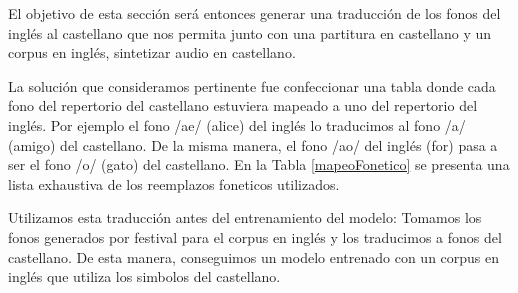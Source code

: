 El objetivo de esta sección será entonces generar una traducción de los fonos del inglés al castellano que nos permita junto con una partitura en castellano y un corpus en inglés, sintetizar audio en castellano.


La solución que consideramos pertinente fue confeccionar una tabla donde cada fono del repertorio del castellano estuviera mapeado a uno del repertorio del inglés. Por ejemplo el fono /ae/ (alice) del inglés lo traducimos al fono /a/ (amigo) del castellano. De la misma manera, el fono /ao/ del inglés (for) pasa a ser el fono /o/ (gato) del castellano. En la Tabla \ref{mapeoFonetico} se presenta una lista exhaustiva de los reemplazos foneticos utilizados.

Utilizamos esta traducción antes del entrenamiento del modelo: Tomamos los fonos generados por festival para el corpus en inglés y los traducimos a fonos del castellano. De esta manera, conseguimos un modelo entrenado con un corpus en inglés que utiliza los simbolos del castellano.

